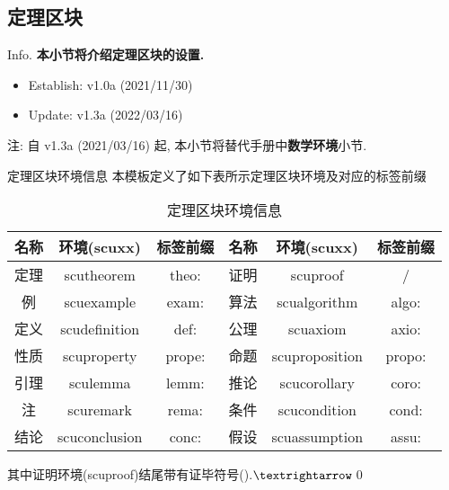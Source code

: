\documentclass[hyperref, UTF8, CJK, aspectratio=169]{beamer}
\begin{document}
\subsection{定理区块}
\begin{frame}{Info.}
	\textbf{本小节将介绍定理区块的设置.}
	\begin{multicols}{2}
		\begin{itemize}
			\item Establish: \textcolor{scugreen}{v1.0a (2021/11/30)}
			\item Update: \textcolor{scugreen}{v1.3a (2022/03/16)}
		\end{itemize}
	\end{multicols}
	注: 自 \textcolor{scugreen}{v1.3a (2021/03/16)} 起, 本小节将替代手册中\alert{\textbf{数学环境}}小节.\par
	\mycopyright
\end{frame}

\begin{frame}{定理区块环境信息}
	本模板定义了如下表所示定理区块环境及对应的标签前缀
	\begin{table}[htbp!]
		\centering
		\caption{定理区块环境信息}
		\label{tab:ShuxueHjdy}
		\begin{tabular}{ccc|ccc}
			\toprule
			名称 &          环境(scuxx)        &  标签前缀  & 名称 &          环境(scuxx)         &  标签前缀  \\ \midrule
			定理 &  \color{scured}scutheorem   &  theo:     & 证明 &    \color{scured}scuproof    &   /     \\
			例   &  \color{scured}scuexample   &  exam:     & 算法 &  \color{scured}scualgorithm  &  algo:  \\
			定义 & \color{scured}scudefinition &  def:      & 公理 &    \color{scured}scuaxiom    &  axio:  \\
			性质 &  \color{scured}scuproperty  &  prope:    & 命题 & \color{scured}scuproposition &  propo: \\
			引理 &   \color{scured}sculemma    &  lemm:     & 推论 &  \color{scured}scucorollary  &  coro:  \\
			注   &   \color{scured}scuremark   &  rema:     & 条件 &  \color{scured}scucondition  &  cond:  \\
			结论 & \color{scured}scuconclusion &  conc:     & 假设 & \color{scured}scuassumption  &  assu:  \\ \bottomrule
		\end{tabular}
	\end{table}
	其中证明环境(scuproof)结尾带有证毕符号().$\textrightarrow$\qed
\end{frame}
	
\end{document}
